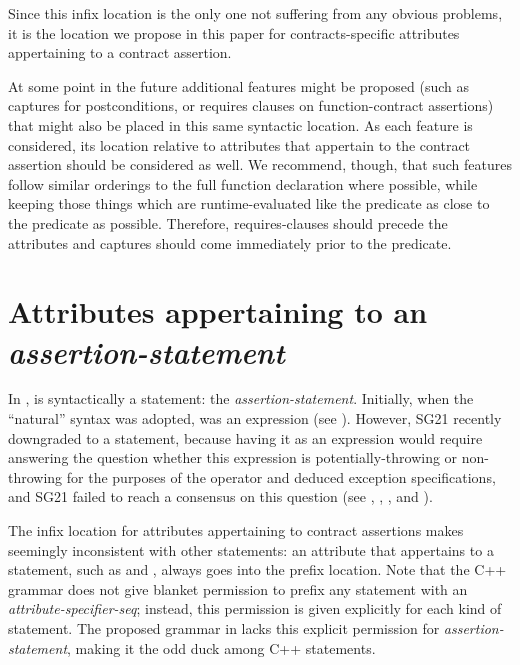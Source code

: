 Since this infix location is the only one not suffering from any obvious problems, it is the location we propose in this paper for contracts-specific attributes appertaining to a contract assertion.

At some point in the future additional features might be proposed (such as captures for postconditions, or requires clauses on function-contract assertions) that might also be placed in this same syntactic location.   As each feature is considered, its location relative to attributes that appertain to the contract assertion should be considered as well.   We recommend, though, that such features follow similar orderings to the full function declaration where possible, while keeping those things which are runtime-evaluated like the predicate as close to the predicate as possible.  Therefore, requires-clauses should precede the attributes and captures should come immediately prior to the predicate.



\section{Attributes appertaining to an \emph{assertion-statement}}
\label{sec:stmt}

In \cite{P2900R5},  is syntactically a statement: the \emph{assertion-statement}. Initially, when the ``natural'' syntax was adopted,  was an expression (see \cite{P2961R2}). However, SG21 recently downgraded  to a statement, because having it as an expression would require answering the question whether this expression is potentially-throwing or non-throwing for the purposes of the  operator and deduced exception specifications, and SG21 failed to reach a consensus on this question (see \cite{P2932R3}, \cite{P2969R0}, \cite{P3113R0}, and \cite{P3114R0}).

The infix location for attributes appertaining to contract assertions makes  seemingly inconsistent with other statements: an attribute that appertains to a statement, such as \tcode{[[likely]]} and \tcode{[[unlikely]]}, always goes into the prefix location. Note that the C++ grammar does not give blanket permission to prefix any statement with an  \emph{attribute-specifier-seq}; instead, this permission is given explicitly for each kind of statement. The proposed grammar in \cite{P2900R5} lacks this explicit permission for \emph{assertion-statement}, making it the odd duck among C++ statements.

